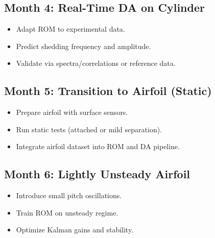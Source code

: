 \subsection*{Month 4: Real-Time DA on Cylinder}
\begin{itemize}
\item Adapt ROM to experimental data.
\item Predict shedding frequency and amplitude.
\item Validate via spectra/correlations or reference data.
\end{itemize}

\subsection*{Month 5: Transition to Airfoil (Static)}
\begin{itemize}
\item Prepare airfoil with surface sensors.
\item Run static tests (attached or mild separation).
\item Integrate airfoil dataset into ROM and DA pipeline.
\end{itemize}

\subsection*{Month 6: Lightly Unsteady Airfoil}
\begin{itemize}
\item Introduce small pitch oscillations.
\item Train ROM on unsteady regime.
\item Optimize Kalman gains and stability.
\end{itemize}



